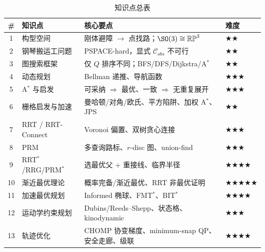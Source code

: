 \begin{table}[H]\centering\small
\caption{知识点总表}
\begin{tabular}{clll}
\toprule
\# & 知识点 & 核心要点 & 难度 \\
\midrule
1 & 构型空间 & 刚体避障 $\to$ 点找路；$\SO(3)\cong\mathbb{RP}^3$ & \(\bigstar\bigstar\) \\
2 & 钢琴搬运工问题 & PSPACE-hard，显式 $\mathcal{C}_{obs}$ 不可行 & \(\bigstar\bigstar\) \\
3 & 图搜索框架 & 仅 $Q$ 排序不同；BFS/DFS/Dijkstra/A$^*$ & \(\bigstar\bigstar\) \\
4 & 动态规划 & Bellman 递推、导航函数 & \(\bigstar\bigstar\bigstar\) \\
5 & A$^*$ 与启发 & 可采纳 $\Rightarrow$ 最优、一致 $\Rightarrow$ 无重复展开 & \(\bigstar\bigstar\bigstar\) \\
6 & 栅格启发与加速 & 曼哈顿/对角/欧氏、平方陷阱、加权 A$^*$、JPS & \(\bigstar\bigstar\) \\
7 & RRT / RRT-Connect & Voronoi 偏置、双树贪心连接 & \(\bigstar\bigstar\bigstar\) \\
8 & PRM & 多查询路标、$r$-disc 图、union-find & \(\bigstar\bigstar\bigstar\) \\
9 & RRT$^*$/RRG/PRM$^*$ & 选最优父 + 重接线、临界半径 & \(\bigstar\bigstar\bigstar\bigstar\) \\
10 & 渐近最优理论 & 概率完备/渐近最优、RRT 非最优证明 & \(\bigstar\bigstar\bigstar\bigstar\bigstar\) \\
11 & 加速最优规划 & Informed 椭球、FMT$^*$、BIT$^*$ & \(\bigstar\bigstar\bigstar\bigstar\) \\
12 & 运动学约束规划 & Dubins/Reeds--Shepp、状态格、kinodynamic & \(\bigstar\bigstar\bigstar\) \\
13 & 轨迹优化 & CHOMP 协变梯度、minimum-snap QP、安全走廊、级联 & \(\bigstar\bigstar\bigstar\bigstar\) \\
\bottomrule
\end{tabular}
\end{table}

